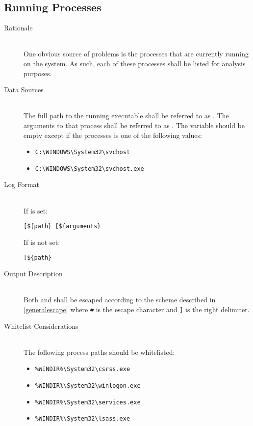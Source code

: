 \subsection{Running Processes}
\begin{description}
\item[Rationale] \hfill \\
One obvious source of problems is the processes that are currently running on
the system.  As such, each of these processes shall be listed for analysis
purposes.  
\item[Data Sources] \hfill \\
The full path to the running executable shall be referred to as .  The
arguments to that process shall be referred to as .  The
 variable should be empty except if the processes is one of the
following values:
\begin{itemize}
  \item \verb|C:\WINDOWS\System32\svchost|
  \item \verb|C:\WINDOWS\System32\svchost.exe|
\end{itemize}
\item[Log Format] \hfill \\
If  is set:
\vspace{-\baselineskip}
\begin{verbatim}
[${path} [${arguments}
\end{verbatim}
If  is not set:
\vspace{-\baselineskip}
\begin{verbatim}
[${path} 
\end{verbatim}
\item[Output Description] \hfill \\
Both  and  shall be escaped according to the scheme
described in \ref{generalescape} where \verb|#| is the escape character and
\verb|]| is the right delimiter.  
\item[Whitelist Considerations] \hfill \\
The following process paths should be whitelisted:
\begin{itemize}
  \item \verb|%WINDIR%\System32\csrss.exe|
  \item \verb|%WINDIR%\System32\winlogon.exe|
  \item \verb|%WINDIR%\System32\services.exe|
  \item \verb|%WINDIR%\System32\lsass.exe|

\end{itemize}
\end{description}
